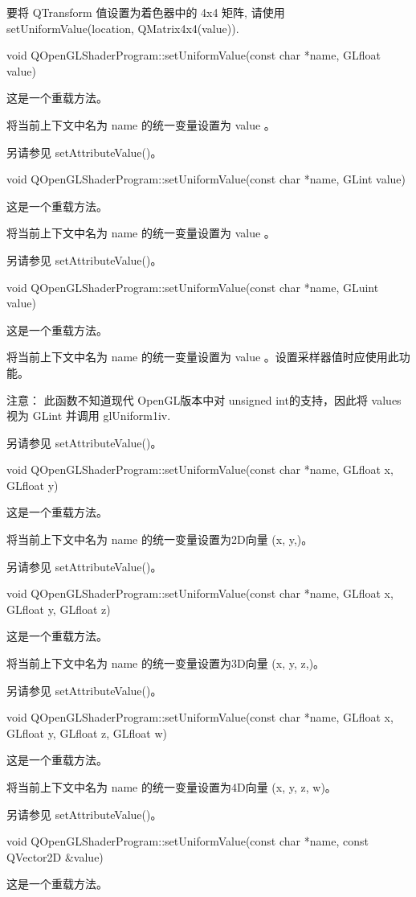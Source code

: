 要将 QTransform 值设置为着色器中的 4x4 矩阵, 请使用 setUniformValue(location, QMatrix4x4(value)).

void QOpenGLShaderProgram::setUniformValue(const char *name, GLfloat value)

这是一个重载方法。

将当前上下文中名为 name 的统一变量设置为 value 。

另请参见 setAttributeValue()。

void QOpenGLShaderProgram::setUniformValue(const char *name, GLint value)

这是一个重载方法。

将当前上下文中名为 name 的统一变量设置为 value 。

另请参见 setAttributeValue()。

void QOpenGLShaderProgram::setUniformValue(const char *name, GLuint value)

这是一个重载方法。

将当前上下文中名为 name 的统一变量设置为 value 。设置采样器值时应使用此功能。

注意： 此函数不知道现代 OpenGL版本中对 unsigned int的支持，因此将 values 视为 GLint 并调用 glUniform1iv.

另请参见 setAttributeValue()。

void QOpenGLShaderProgram::setUniformValue(const char *name, GLfloat x, GLfloat y)

这是一个重载方法。

将当前上下文中名为 name 的统一变量设置为2D向量 (x, y,)。

另请参见 setAttributeValue()。

void QOpenGLShaderProgram::setUniformValue(const char *name, GLfloat x, GLfloat y, GLfloat z)

这是一个重载方法。

将当前上下文中名为 name 的统一变量设置为3D向量 (x, y, z,)。

另请参见 setAttributeValue()。

void QOpenGLShaderProgram::setUniformValue(const char *name, GLfloat x, GLfloat y, GLfloat z, GLfloat w)

这是一个重载方法。

将当前上下文中名为 name 的统一变量设置为4D向量 (x, y, z, w)。

另请参见 setAttributeValue()。

void QOpenGLShaderProgram::setUniformValue(const char *name, const QVector2D \&value)

这是一个重载方法。

